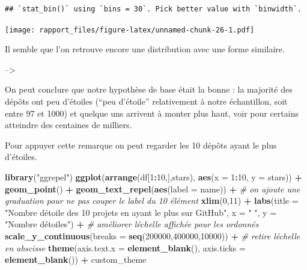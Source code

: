 \documentclass[
]{article}
\newenvironment{Shaded}{\begin{snugshade}}{\end{snugshade}}
\newcommand{\AttributeTok}[1]{\textcolor[rgb]{0.13,0.29,0.53}{#1}}
\newcommand{\CommentTok}[1]{\textcolor[rgb]{0.56,0.35,0.01}{\textit{#1}}}
\newcommand{\DecValTok}[1]{\textcolor[rgb]{0.00,0.00,0.81}{#1}}
\newcommand{\FunctionTok}[1]{\textcolor[rgb]{0.13,0.29,0.53}{\textbf{#1}}}
\newcommand{\NormalTok}[1]{#1}
\newcommand{\SpecialCharTok}[1]{\textcolor[rgb]{0.81,0.36,0.00}{\textbf{#1}}}
\newcommand{\StringTok}[1]{\textcolor[rgb]{0.31,0.60,0.02}{#1}}
\begin{document}
\begin{verbatim}
## `stat_bin()` using `bins = 30`. Pick better value with `binwidth`.
\end{verbatim}

\texttt{[image: rapport\_files/figure-latex/unnamed-chunk-26-1.pdf]}

Il semble que l'on retrouve encore une distribution avec une forme
similaire.

--\textgreater{}

On peut conclure que notre hypothèse de base était la bonne : la
majorité des dépôts ont peu d'étoiles (``peu d'étoile'' relativement à
notre échantillon, soit entre 97 et 1000) et quelque uns arrivent à
monter plus haut, voir pour certains atteindre des centaines de
milliers.

Pour appuyer cette remarque on peut regarder les 10 dépôts ayant le plus
d'étoiles.

\begin{Shaded}
\begin{Highlighting}[]
\FunctionTok{library}\NormalTok{(}\StringTok{"ggrepel"}\NormalTok{)}
\FunctionTok{ggplot}\NormalTok{(}\FunctionTok{arrange}\NormalTok{(df[}\DecValTok{1}\SpecialCharTok{:}\DecValTok{10}\NormalTok{,],stars),}
       \FunctionTok{aes}\NormalTok{(}\AttributeTok{x =} \DecValTok{1}\SpecialCharTok{:}\DecValTok{10}\NormalTok{, }\AttributeTok{y =}\NormalTok{ stars)) }\SpecialCharTok{+}
    \FunctionTok{geom\_point}\NormalTok{() }\SpecialCharTok{+}
    \FunctionTok{geom\_text\_repel}\NormalTok{(}\FunctionTok{aes}\NormalTok{(}\AttributeTok{label =}\NormalTok{ name)) }\SpecialCharTok{+}
    \CommentTok{\# on ajoute une graduation pour ne pas couper le label du 10 élément}
    \FunctionTok{xlim}\NormalTok{(}\DecValTok{0}\NormalTok{,}\DecValTok{11}\NormalTok{) }\SpecialCharTok{+}
    \FunctionTok{labs}\NormalTok{(}\AttributeTok{title =} \StringTok{"Nombre d\textquotesingle{}étoile des 10 projets en ayant le plus}
\StringTok{         sur GitHub"}\NormalTok{,}
         \AttributeTok{x =} \StringTok{" "}\NormalTok{,}
         \AttributeTok{y =} \StringTok{"Nombre d\textquotesingle{}étoiles"}\NormalTok{) }\SpecialCharTok{+}
    \CommentTok{\# améliorer l\textquotesingle{}échelle affichée pour les ordonnés}
    \FunctionTok{scale\_y\_continuous}\NormalTok{(}\AttributeTok{breaks =} \FunctionTok{seq}\NormalTok{(}\DecValTok{200000}\NormalTok{,}\DecValTok{400000}\NormalTok{,}\DecValTok{10000}\NormalTok{)) }\SpecialCharTok{+}
    \CommentTok{\# retire l\textquotesingle{}échelle en abscisse}
    \FunctionTok{theme}\NormalTok{(}\AttributeTok{axis.text.x =} \FunctionTok{element\_blank}\NormalTok{(),}
          \AttributeTok{axis.ticks =} \FunctionTok{element\_blank}\NormalTok{()) }\SpecialCharTok{+}
\NormalTok{  custom\_theme}
\end{Highlighting}
\end{Shaded}
\end{document}
